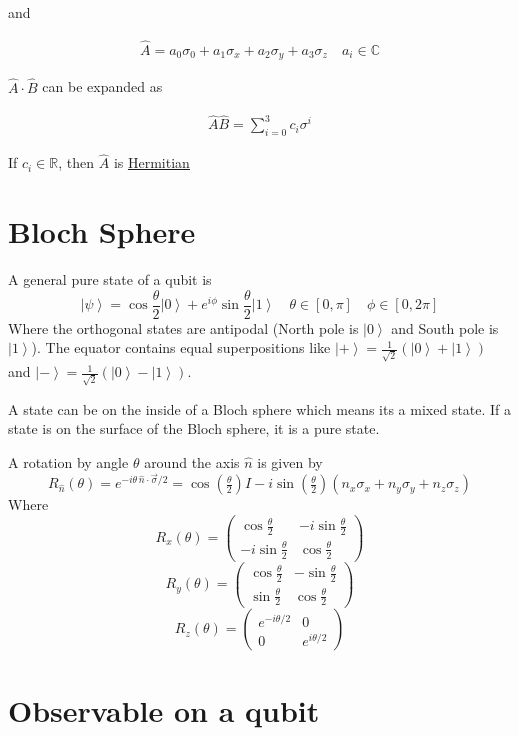 \documentclass[
]{article}
\let\oldhyperref\hyperref
\renewcommand{\hyperref}[2][]{\oldhyperref[#1]{\underline{#2}}}
\providecommand{\ket}[1]{\left\lvert #1 \right\rangle}
\begin{document}
and

\begin{gather*}
	\hat{A}=a_0\sigma_0+a_1\sigma_x+a_2\sigma_y+a_3\sigma_z\quad a_i\in \mathbb{C}
\end{gather*}

\(\hat{A}\cdot\hat{B}\) can be expanded as

\begin{gather*}
	\hat{A}\hat{B}=\sum_{i=0}^3c_i\sigma^i
\end{gather*}

If \(c_i\in\mathbb{R}\), then \(\hat{A}\) is \hyperref[hermitian-operators]{Hermitian}

\section{Bloch Sphere}\label{bloch-sphere}
A general pure state of a qubit is
\[
	\ket{\psi}=\cos\frac{\theta}{2}\ket{0}+e^{i\phi}\sin\frac{\theta}{2}\ket{1}\quad \theta\in[0,\pi]\quad \phi\in[0,2\pi]
\]
Where the orthogonal states are antipodal (North pole is \(\ket{0}\) and South pole is \(\ket{1}\)).
The equator contains equal superpositions like \(\ket{+}=\frac{1}{\sqrt{2}}(\ket{0}+\ket{1})\) and \(\ket{-}=\frac{1}{\sqrt{2}}(\ket{0}-\ket{1})\).

A state can be on the inside of a Bloch sphere which means its a mixed state. If a state is on the surface of the Bloch sphere, it is a pure state.

A rotation by angle \(\theta\) around the axis \(\hat{n}\) is given by
\[
	R_{\hat{n}}(\theta) = e^{-i\theta\,\hat{n}\cdot\vec{\sigma}/2} = \cos\left(\tfrac{\theta}{2}\right)I - i\sin\left(\tfrac{\theta}{2}\right)(n_x\sigma_x + n_y\sigma_y + n_z\sigma_z)
\]
Where
\[
	R_x(\theta) = \begin{pmatrix} \cos\tfrac{\theta}{2} & -i\sin\tfrac{\theta}{2} \\ -i\sin\tfrac{\theta}{2} & \cos\tfrac{\theta}{2} \end{pmatrix}
\]
\[
	R_y(\theta) = \begin{pmatrix} \cos\tfrac{\theta}{2} & -\sin\tfrac{\theta}{2} \\ \sin\tfrac{\theta}{2} & \cos\tfrac{\theta}{2} \end{pmatrix}
\]
\[
	R_z(\theta) = \begin{pmatrix} e^{-i\theta/2} & 0 \\ 0 & e^{i\theta/2} \end{pmatrix}
\]
\section{Observable on a qubit}\label{observable-on-a-qubit}
\end{document}
